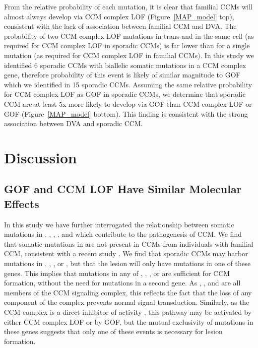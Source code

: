 From the relative probability of each mutation, it is clear that familial CCMs will almost always develop via CCM complex LOF (Figure~\ref{MAP_model} top), consistent with the lack of association between familial CCM and DVA. The probability of two CCM complex LOF mutations in trans and in the same cell (as required for CCM complex LOF in sporadic CCMs) is far lower than for a single mutation (as required for CCM complex LOF in familial CCMs). In this study we identified 6 sporadic CCMs with biallelic somatic mutations in a CCM complex gene, therefore probability of this event is likely of similar magnitude to  GOF which we identified in 15 sporadic CCMs. Assuming the same relative probability for CCM complex LOF as  GOF in sporadic CCMs, we determine that sporadic CCM are at least 5x more likely to develop via  GOF than CCM complex LOF or  GOF (Figure~\ref{MAP_model} bottom). This finding is consistent with the strong association between DVA and sporadic CCM.



\section{Discussion}

\subsection{ GOF and CCM LOF Have Similar Molecular Effects}
In this study we have further interrogated the relationship between somatic mutations in , , , , and  which contribute to the pathogenesis of CCM. We find that somatic mutations in  are not present in CCMs from individuals with familial CCM, consistent with a recent study \citep{weng2021}.  We find that sporadic CCMs may harbor mutations in , , , or , but that the lesion will only have mutations in one of these genes. This implies that mutations in any of , , , or  are sufficient for CCM formation, without the need for mutations in a second gene. As , , and  are all members of the CCM signaling complex, this reflects the fact that the loss of any component of the complex prevents normal signal transduction. Similarly, as the CCM complex is a direct inhibitor of  activity \citep{zhou2015}, this pathway may be activated by either CCM complex LOF or by  GOF, but the mutual exclusivity of mutations in these genes suggests that only one of these events is necessary for lesion formation. 

